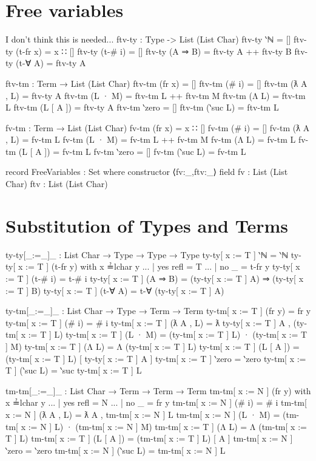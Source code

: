 \documentclass[logo,bsc,singlespacing,parskip,online]{infthesis}
\renewenvironment{code}{\mintedcopy[breaklines,breaksymbolleft=\;]{agda}}{\endmintedcopy}
\begin{document}
\section{Free variables}
I don't think this is needed...
\begin{code}
  ftv-ty : Type -> List (List Char)
  ftv-ty ‵ℕ = []
  ftv-ty (t-fr x) = x ∷ []
  ftv-ty (t-# i) = []
  ftv-ty (A ⇒ B) = ftv-ty A ++ ftv-ty B
  ftv-ty (t-∀ A) = ftv-ty A

  ftv-tm : Term → List (List Char)
  ftv-tm (fr x) = []
  ftv-tm (# i) = []
  ftv-tm (ƛ A , L) = ftv-ty A
  ftv-tm (L · M) = ftv-tm L ++ ftv-tm M
  ftv-tm (Λ L) = ftv-tm L
  ftv-tm (L [ A ]) = ftv-ty A
  ftv-tm ‵zero = []
  ftv-tm (‵suc L) = ftv-tm L

  fv-tm : Term → List (List Char)
  fv-tm (fr x) = x ∷ []
  fv-tm (# i) = []
  fv-tm (ƛ A , L) = fv-tm L
  fv-tm (L · M) = fv-tm L ++ fv-tm M
  fv-tm (Λ L) = fv-tm L
  fv-tm (L [ A ]) = fv-tm L
  fv-tm ‵zero = []
  fv-tm (‵suc L) = fv-tm L

  record FreeVariables : Set where
    constructor ⟨fv:_,ftv:_⟩
    field
      fv : List (List Char)
      ftv : List (List Char)
\end{code}

\section{Substitution of Types and Terms}
\begin{code}
  ty-ty[_:=_]_ : List Char → Type → Type → Type
  ty-ty[ x := T ] ‵ℕ = ‵ℕ
  ty-ty[ x := T ] (t-fr y) with x ≟lchar y
  ... | yes refl = T
  ... | no  _    = t-fr y
  ty-ty[ x := T ] (t-# i) = t-# i
  ty-ty[ x := T ] (A ⇒ B) = (ty-ty[ x := T ] A) ⇒ (ty-ty[ x := T ] B)
  ty-ty[ x := T ] (t-∀ A) = t-∀ (ty-ty[ x := T ] A)

  ty-tm[_:=_]_ : List Char → Type → Term → Term
  ty-tm[ x := T ] (fr y) = fr y
  ty-tm[ x := T ] (# i) = # i
  ty-tm[ x := T ] (ƛ A , L) = ƛ ty-ty[ x := T ] A , (ty-tm[ x := T ] L) 
  ty-tm[ x := T ] (L · M) = (ty-tm[ x := T ] L) · (ty-tm[ x := T ] M)
  ty-tm[ x := T ] (Λ L) = Λ (ty-tm[ x := T ] L)
  ty-tm[ x := T ] (L [ A ]) = (ty-tm[ x := T ] L) [ ty-ty[ x := T ] A ]
  ty-tm[ x := T ] ‵zero = ‵zero
  ty-tm[ x := T ] (‵suc L) = ‵suc ty-tm[ x := T ] L

  tm-tm[_:=_]_ : List Char → Term → Term → Term
  tm-tm[ x := N ] (fr y) with x ≟lchar y
  ... | yes refl = N
  ... | no  _    = fr y
  tm-tm[ x := N ] (# i) = # i
  tm-tm[ x := N ] (ƛ A , L) = ƛ A , tm-tm[ x := N ] L
  tm-tm[ x := N ] (L · M) = (tm-tm[ x := N ] L) · (tm-tm[ x := N ] M)
  tm-tm[ x := T ] (Λ L) = Λ (tm-tm[ x := T ] L)
  tm-tm[ x := T ] (L [ A ]) = (tm-tm[ x := T ] L) [ A ]
  tm-tm[ x := N ] ‵zero = ‵zero
  tm-tm[ x := N ] (‵suc L) = tm-tm[ x := N ] L
\end{code}
\end{document}
